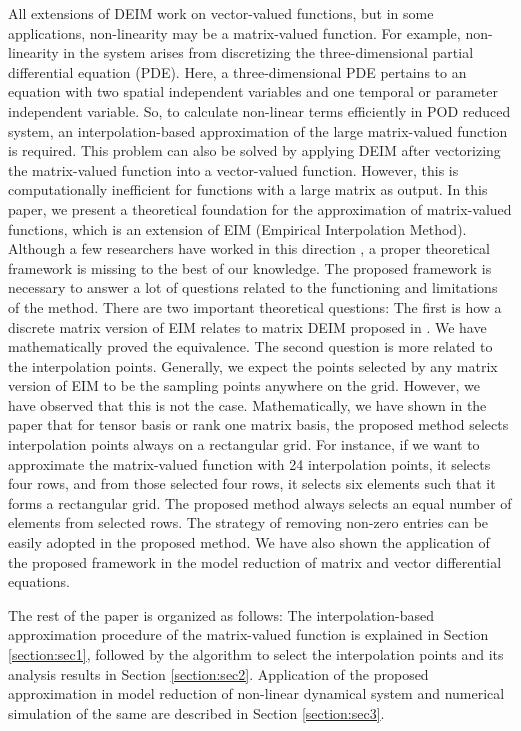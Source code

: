 \documentclass{article}
\begin{document}
All extensions of DEIM work on vector-valued functions, but in some applications, non-linearity may be a matrix-valued function.
For example, non-linearity in the system arises from discretizing
the three-dimensional partial differential equation (PDE). Here, a three-dimensional PDE pertains to an equation with two spatial independent variables and one temporal or parameter independent variable. So, to calculate non-linear terms efficiently in POD reduced system, an interpolation-based approximation of the large matrix-valued function is required. This problem can also be solved by applying DEIM after vectorizing the matrix-valued function into a vector-valued function. However, this is computationally inefficient for functions with a large matrix as output. In this paper, we present a theoretical foundation for the approximation of matrix-valued functions, which is an extension of EIM (Empirical Interpolation Method). Although a few researchers have worked in this direction \cite{MatrixDEIM,GK2}, a proper theoretical framework is missing to the best of our knowledge. The proposed framework is necessary to answer a lot of questions related to the functioning and limitations of the method. There are two important theoretical questions: The first is how a discrete matrix version of EIM relates to matrix DEIM proposed in \cite{MatrixDEIM}. We have mathematically proved the equivalence. The second question is more related to the interpolation points. Generally, we expect the points selected by any matrix version of EIM to be the sampling points anywhere on the grid. However, we have observed that this is not the case. Mathematically, we have shown in the paper that for tensor basis or rank one matrix basis, the proposed method selects interpolation points always on a rectangular grid. For instance, if we want to approximate the matrix-valued function with 24 interpolation points, it selects four rows, and from those selected four rows, it selects six elements such that it forms a rectangular grid. The proposed method always selects an equal number of elements from selected rows. The strategy of removing non-zero entries \cite{wirtz} can be easily adopted in the proposed method. We have also shown the application of the proposed framework in the model reduction of matrix and vector differential equations.  

The rest of the paper is organized as follows: The interpolation-based approximation procedure of the matrix-valued function is explained in Section \ref{section:sec1}, followed by the algorithm to select the interpolation points and its analysis results in Section \ref{section:sec2}. Application of the proposed approximation in model reduction of non-linear dynamical system and numerical simulation of the same are described in Section \ref{section:sec3}.
\end{document}
